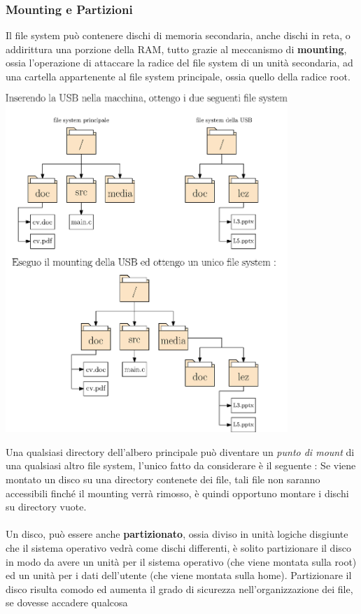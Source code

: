 \documentclass[12pt, letterpaper]{article}
\newcommand{\acc}{\\\hphantom{}\\}
\begin{document}
\subsubsection{Mounting e Partizioni}
Il file system può contenere dischi di memoria secondaria, anche dischi in reta, o addirittura una porzione della RAM, tutto 
grazie al meccanismo di \textbf{mounting}, ossia l'operazione di attaccare la radice del file system di un unità secondaria, ad una 
cartella appartenente al file system principale, ossia quello della radice root. \begin{center}
    \includegraphics[width=0.8\textwidth ]{images/mounting.eps}
\end{center}
Una qualsiasi directory dell'albero principale può diventare un \textit{punto di mount} di una qualsiasi altro 
file system, l'unico fatto da considerare è il seguente : Se viene montato un disco su una directory contenete dei file, 
tali file non saranno accessibili finché il mounting verrà rimosso, è quindi opportuno montare i dischi su directory vuote.\acc 
Un disco, può essere anche \textbf{partizionato}, ossia diviso in unità logiche disgiunte che il sistema operativo vedrà come 
 dischi differenti, è solito partizionare il disco in modo da avere un unità per il sistema operativo (che viene montata sulla 
 root) ed un unità per i dati dell'utente (che viene montata sulla home).
 Partizionare il disco risulta comodo ed aumenta il grado di sicurezza nell'organizzazione dei file, se dovesse accadere qualcosa 
\end{document}
